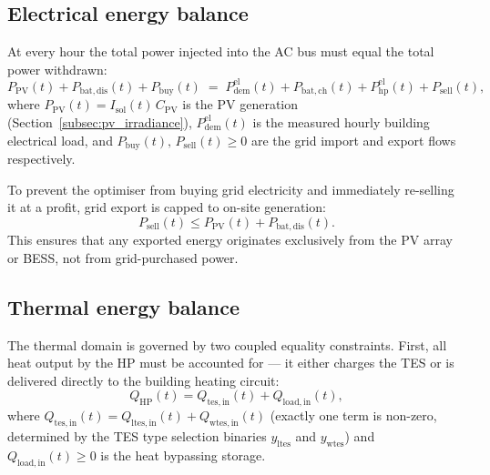 \documentclass[11pt,a4paper]{report}
\begin{document}
\subsection{Electrical energy balance}
\label{sub:elec_balance}

At every hour the total power injected into the AC bus must equal the total power
withdrawn:
\begin{equation}
    P_\mathrm{PV}(t) + P_\mathrm{bat,dis}(t) + P_\mathrm{buy}(t)
    \;=\;
    P_\mathrm{dem}^\mathrm{el}(t) + P_\mathrm{bat,ch}(t)
    + P_\mathrm{hp}^\mathrm{el}(t) + P_\mathrm{sell}(t),
    \label{eq:elec_balance}
\end{equation}
where $P_\mathrm{PV}(t) = I_\mathrm{sol}(t)\,C_\mathrm{PV}$ is the PV generation
(Section~\ref{subsec:pv_irradiance}), $P_\mathrm{dem}^\mathrm{el}(t)$ is the
measured hourly building electrical load, and $P_\mathrm{buy}(t),\,P_\mathrm{sell}(t)
\geq 0$ are the grid import and export flows respectively.

To prevent the optimiser from buying grid electricity and immediately re-selling it
at a profit, grid export is capped to on-site generation:
\begin{equation}
    P_\mathrm{sell}(t) \leq P_\mathrm{PV}(t) + P_\mathrm{bat,dis}(t).
    \label{eq:sell_limit}
\end{equation}
This ensures that any exported energy originates exclusively from the PV array or
BESS, not from grid-purchased power.

\subsection{Thermal energy balance}
\label{sub:therm_balance}

The thermal domain is governed by two coupled equality constraints.
First, all heat output by the HP must be accounted for — it either charges the TES
or is delivered directly to the building heating circuit:
\begin{equation}
    Q_\mathrm{HP}(t) = Q_\mathrm{tes,in}(t) + Q_\mathrm{load,in}(t),
    \label{eq:hp_split}
\end{equation}
where $Q_\mathrm{tes,in}(t) = Q_\mathrm{ltes,in}(t) + Q_\mathrm{wtes,in}(t)$
(exactly one term is non-zero, determined by the TES type selection binaries
$y_\mathrm{ltes}$ and $y_\mathrm{wtes}$) and $Q_\mathrm{load,in}(t) \geq 0$
is the heat bypassing storage.
\end{document}
